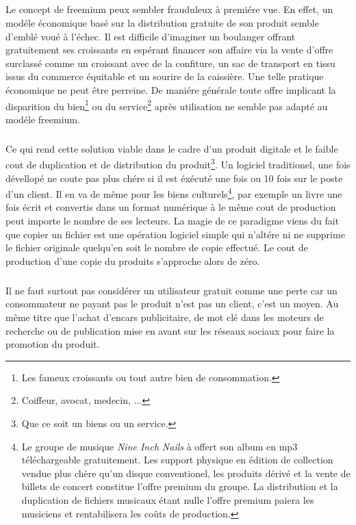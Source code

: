 \documentclass[11pt, a4paper ]{article}
\begin{document}
\paragraph{} %
	\subparagraph{} %
Le concept de freemium peux sembler frauduleux à premiére vue. En effet, un modéle économique basé sur la distribution gratuite de son produit semble d'emblé voué à l'échec. Il est difficile d'imaginer un boulanger offrant gratuitement ses croissants en espérant financer son affaire via la vente d'offre surclassé comme un croissant avec de la confiture, un sac de transport en tissu issus du commerce équitable et un sourire de la caissière. Une telle pratique économique ne peut être perreine. De maniére générale toute offre implicant la disparition du bien\footnote{Les fameux croissants ou tout autre bien de consommation.} ou du service\footnote{Coiffeur, avocat, medecin, ...} après utilisation ne semble pas adapté au modéle freemium.
\subparagraph{}
Ce qui rend cette solution viable dans le cadre d'un produit digitale et le faible cout de duplication et de distribution du produit\footnote{Que ce soit un biens ou un service.}. Un logiciel traditionel, une fois dévellopé ne coute pas plus chére si il est éxécuté une fois ou 10 fois sur le poste d'un client. Il en va de même pour les biens culturels\footnote{Le groupe de musique \emph{Nine Inch Nails} à offert son album en mp3 téléchargeable gratuitement. Les support physique en édition de collection vendue plus chère qu'un disque conventionel, les produits dérivé et la vente de billets de concert constitue l'offre premium du groupe. La distribution et la duplication de fichiers musicaux étant nulle l'offre premium paiera les musiciens et rentabilisera les coûts de production.}, par exemple un livre une fois écrit et convertis dans un format numérique à le même cout de production peut importe le nombre de ses lecteurs. La magie de ce paradigme viens du fait que copier un fichier est une opération logiciel simple qui n'altére ni ne supprime le fichier originale quelqu'en soit le nombre de copie effectué. Le cout de production d'une copie du produits s'approche alors de zéro.
\subparagraph{}
Il ne faut surtout pas considérer un utilisateur gratuit comme une perte car un consommateur ne payant pas le produit n'est pas un client, c'est un moyen. Au même titre que l'achat d'encars publicitaire, de mot clé dans les moteurs de recherche ou de publication mise en avant sur les réseaux sociaux pour faire la promotion du produit.
\end{document}
